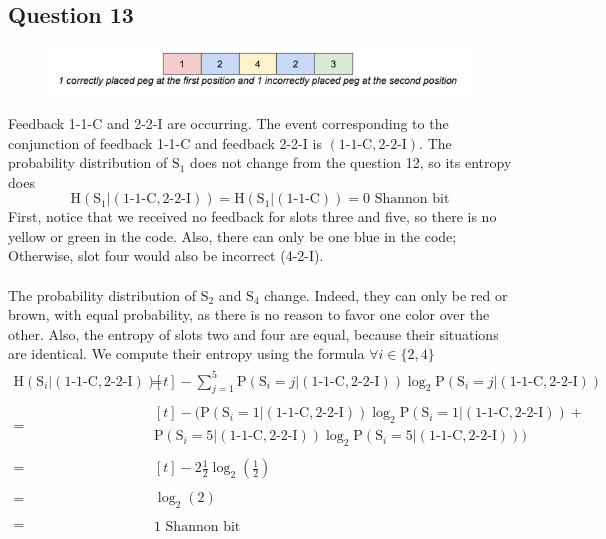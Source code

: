 \documentclass{article}
\begin{document}
\subsection*{Question 13}
\begin{figure}[H]
    \centering
    \includegraphics[width=1\linewidth]{question13.png}
\end{figure}
Feedback 1-1-C and 2-2-I are occurring. The event corresponding to the conjunction of feedback 1-1-C and feedback 2-2-I is $(\mbox{1-1-C}, \mbox{2-2-I})$. The probability distribution of $\mbox{S}_1$ does not change from the question 12, so its entropy does
$$
\mbox{H}(\mbox{S}_1|(\mbox{1-1-C},\mbox{2-2-I})) = \mbox{H}(\mbox{S}_1|(\mbox{1-1-C})) = 0 \mbox{ Shannon bit}
$$
First, notice that we received no feedback for slots three and five, so there is no yellow or green in the code. Also, there can only be one blue in the code; Otherwise, slot four would also be incorrect (4-2-I).
\\\\
The probability distribution of $\mbox{S}_2$ and  $\mbox{S}_4$ change. Indeed, they can only be red or brown, with equal probability, as there is no reason to favor one color over the other. Also, the entropy of slots two and four are equal, because their situations are identical. We compute their entropy using the formula  $\forall i \in \{2,4\}$
\begin{align*}
    \mbox{H}(\mbox{S}_i|(\mbox{1-1-C},\mbox{2-2-I}))=&\begin{multlined}[t]
        - \sum_{j=1}^5\mbox{P}(\mbox{S}_i=j|(\mbox{1-1-C},\mbox{2-2-I}))\log_2\mbox{P}(\mbox{S}_i=j|(\mbox{1-1-C},\mbox{2-2-I}))
    \end{multlined}\\
    =&\begin{multlined}[t]
    -(\mbox{P}(\mbox{S}_i=1|(\mbox{1-1-C},\mbox{2-2-I}))\log_2\mbox{P}(\mbox{S}_i=1|(\mbox{1-1-C},\mbox{2-2-I})) +\\ \mbox{P}(\mbox{S}_i=5|(\mbox{1-1-C},\mbox{2-2-I}))\log_2\mbox{P}(\mbox{S}_i=5|(\mbox{1-1-C},\mbox{2-2-I}))  )
    \end{multlined}\\
    =&\begin{multlined}[t]
    -2\frac{1}{2}\log_2\left(\frac{1}{2}\right)
    \end{multlined}\\
    =&\begin{multlined}
        \log_2(2)
    \end{multlined}\\
    =&\begin{multlined}
        1 \mbox{ Shannon bit}
    \end{multlined}\\
\end{align*}
\end{document}

